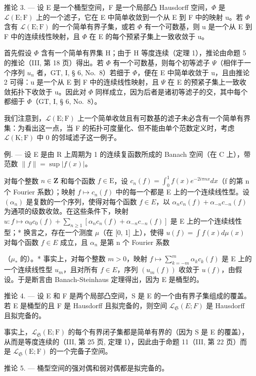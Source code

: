 推论 3. --- 设 E 是一个桶型空间，F 是一个局部凸 Hausdorff 空间，\(\Phi\) 是 \(\mathcal{L}(\mathrm{E};\mathrm{F})\) 上的一个滤子，它在 E 中简单收敛到一个从 E 到 F 中的映射 u。若 \(\Phi\) 含有 \(\mathcal{L}(\mathrm{E};\mathrm{F})\) 的一个简单有界子集，或若 \(\Phi\) 有一个可数基，则 u 是一个从 E 到 F 中的连续线性映射，且 \(\Phi\) 在 E 的每个预紧子集上一致收敛于 u。

首先假设 \(\Phi\) 含有一个简单有界集 H；由于 H 等度连续（定理 1），推论由命题 5 的推论（III, 第 18 页）得出。若 \(\Phi\) 有一个可数基，则每个初等滤子 \(\Psi\)（相伴于一个序列 \(u_{n}\) 者，GT, I, § 6, No.~8）若细于 \(\Phi\)，便在 E 中简单收敛于 u，且由推论 2 可得：u 是一个从 E 到 F 中的连续线性映射，且 \(\Psi\) 在 E 的预紧子集上一致收敛拓扑下收敛于 u。因此对 \(\Phi\) 同样成立，因为后者是诸初等滤子的交，其中每个都细于 \(\Phi\)（GT, I, § 6, No.~8）。

我们注意到，\(\mathcal{L}(\mathrm{E};\mathrm{F})\) 上一个简单收敛且有可数基的滤子未必含有一个简单有界集：为看出这一点，当 F 的拓扑可度量化、但不能由单个范数定义时，考虑 \(\mathcal{L}(\mathrm{K};\mathrm{F})\) 中 0 的邻域滤子这一例子。

例. --- 设 E 是由 R 上周期为 1 的连续复函数所成的 Banach 空间（在 C 上），带范数 \(\|f\| = \sup |f(x)|\)。

对每个整数 \(n \in \mathbf{Z}\) 和每个函数 \(f \in \mathrm{E}\)，设 \(c_{n}(f) = \int_{0}^{1} f(x)e^{-2i\pi nx} dx\)（f 的第 n 个 Fourier 系数）；映射 \(f \mapsto c_{n}(f)\) 中的每一个都是 E 上的一个连续线性型。设 \((\alpha_{n})\) 是复数的一个序列，使得对每个函数 \(f \in E\)，以 \(\alpha_{n}c_{n}(f) + \alpha_{-n}c_{-n}(f)\) 为通项的级数收敛。在这些条件下，映射 \(u: f \mapsto \alpha_{0}c_{0}(f) + \sum_{n \geqslant 1} [\alpha_{n}c_{n}(f) + \alpha_{-n}c_{-n}(f)]\) 是 E 上的一个连续线性型；* 换言之，存在一个测度 \(\mu\)（在 {[}0, 1{]} 上），使得 \(u(f) = \int f(x) d\mu(x)\) 对每个函数 \(f \in E\) 成立，且 \(\alpha_{n}\) 是第 n 个 Fourier 系数

（\(\mu_{*}\) 的）。* 事实上，对每个整数 \(m > 0\)，映射 \(f \mapsto \sum_{k = -m}^{m} \alpha_k c_k(f)\) 是 E 上的一个连续线性型 \(u_{m}\)，且对所有 \(f \in E\)，序列 \((u_{m}(f))\) 收敛于 \(u(f)\)，由假设。于是断言由 Banach-Steinhaus 定理得出，因为 E 是桶型的。

推论 4. --- 设 E 和 F 是两个局部凸空间，S 是 E 的一个由有界子集组成的覆盖。若 E 是桶型的且 F 是 Hausdorff 且拟完备的，则空间 \(\mathcal{L}_{\mathfrak{S}}(E;F)\) 是 Hausdorff 且拟完备的。

事实上，\(\mathcal{L}_{\mathfrak{S}}(\mathrm{E};\mathrm{F})\) 的每个有界闭子集都是简单有界的（因为 S 是 E 的覆盖），从而是等度连续的（III, 第 25 页, 定理 1），因此由于命题 11（III, 第 22 页）而是 \(\mathcal{L}_{\mathfrak{S}}(\mathrm{E};\mathrm{F})\) 的一个完备子空间。

推论 5. --- 桶型空间的强对偶和弱对偶都是拟完备的。


